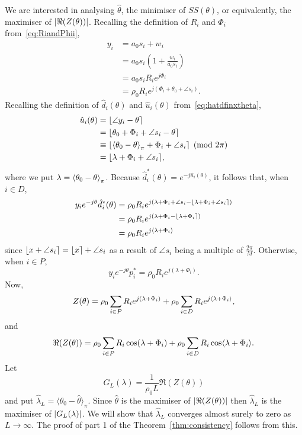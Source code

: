 \documentclass[journal]{IEEEtran}
\begin{document}
We are interested in analysing $\hat{\theta}$, the minimiser of $SS(\theta)$, or equivalently, the maximiser of ${\left\vert \Re(Z(\theta)) \right\vert}$.  Recalling the definition of $R_i$ and $\Phi_i$ from~\eqref{eq:RiandPhii},
\begin{align*}
y_i &= a_0 s_i + w_i \\
&= a_0 s_i \left( 1 + \frac{w_i}{a_0 s_i} \right) \\
&= a_0 s_i R_i e^{j \Phi_i} \\
&= \rho_0 R_i e^{j ( \Phi_i + \theta_0 + \angle{s_i}) }.
\end{align*}
Recalling the definition of $\hat{d}_i(\theta)$ and $\hat{u}_i(\theta)$ from~\eqref{eq:hatdfinxtheta},
\begin{align*}
\hat{u}_i(\theta) &= {\left\lfloor \angle{y_i} - \theta \right\rceil} \\
&= {\left\lfloor \theta_0 + \Phi_i + \angle{s_i} - \theta \right\rceil} \\
&\equiv {\left\lfloor  \left\langle \theta_0 - \theta \right\rangle_{\pi} + \Phi_i + \angle{s_i} \right\rceil} \pmod{2\pi} \\
&= {\left\lfloor  \lambda + \Phi_i + \angle{s_i}  \right\rceil},
\end{align*}
where we put $\lambda = \left\langle \theta_0 - \theta \right\rangle_\pi$.  Because $\hat{d}_i^*(\theta) = e^{-j\hat{u}_i(\theta)}$, it follows that, when $i \in D$,
\begin{align}
 y_i e^{-j\theta} \hat{d}_i^*(\theta) &= \rho_0 R_i e^{j(\lambda + \Phi_i + \angle{s_i} - {\left\lfloor \lambda + \Phi_i + \angle{s_i} \right\rceil})} \nonumber \\
&= \rho_0 R_i e^{j(\lambda + \Phi_i - {\left\lfloor \lambda + \Phi_i \right\rceil})} \nonumber  \\
&= \rho_0 R_i e^{j\langle \lambda + \Phi_i \rangle} \label{eq:yethetadhat}
\end{align}
since ${\left\lfloor x + \angle{s_i} \right\rceil} = {\left\lfloor x \right\rceil} + \angle{s_i}$ as a result of $\angle{s_i}$ being a multiple of $\tfrac{2\pi}{M}$.  Otherwise, when $i \in P$,  
\[
y_i e^{-j\theta} p_i^* = \rho_0 R_i e^{j(\lambda + \Phi_i)}.
\]
Now,
\[
Z(\theta) = \rho_0 \sum_{i \in P} R_i e^{j(\lambda + \Phi_i)} + \rho_0  \sum_{i \in D} R_i e^{j\langle \lambda + \Phi_i \rangle},
\]
and
\[
\Re(Z(\theta)) = \rho_0 \sum_{i \in P} R_i \cos(\lambda + \Phi_i) + \rho_0 \sum_{i \in D} R_i \cos\langle \lambda + \Phi_i \rangle.
\] 
Let 
\begin{equation}\label{eq:GLdefn}
G_L(\lambda) = \frac{1}{\rho_0 L} \Re(Z(\theta))
\end{equation}
and put $\hat{\lambda}_L = \langle\theta_0 - \hat{\theta}\rangle_\pi$.  Since $\hat{\theta}$ is the maximiser of ${\left\vert \Re(Z(\theta)) \right\vert}$ then  $\hat{\lambda}_L$ is the maximiser of ${\left\vert G_L(\lambda) \right\vert}$.  We will show that $\hat{\lambda}_L$ converges almost surely to zero as $L \rightarrow \infty$.  The proof of part 1 of the Theorem~\ref{thm:consistency} follows from this.
\end{document}
